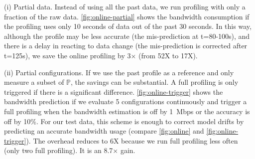 (i) Partial data. Instead of using all the past data, we run profiling with only
a fraction of the raw data.  \autoref{fig:online-partial} shows the bandwidth
consumption if the profiling uses only 10 seconds of data out of the past 30
seconds. In this way, although the profile may be less accurate (the
mis-prediction at t=80-100s), and there is a delay in reacting to data change
(the mis-prediction is corrected after t=125s), we save the online profiling by
3$\times$ (from 52X to 17X).

(ii) Partial configurations. If we use the past profile as a reference and only
measure a subset of $\mathbb{P}$, the savings can be substantial. A full
profiling is only triggered if there is a significant
difference. \autoref{fig:online-trigger} shows the bandwidth prediction if we
evaluate 5 configurations continuously and trigger a full profiling when the
bandwidth estimation is off by \SI{1}{Mbps} or the accuracy is off by 10\%.  For
our test data, this scheme is enough to correct model drifts by predicting an
accurate bandwidth usage (compare \autoref{fig:online} and
\autoref{fig:online-trigger}).  The overhead reduces to 6X because we run full
profiling less often (only two full profiling). It is an 8.7$\times$ gain.


